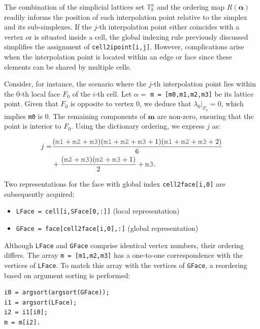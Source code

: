 \documentclass[12pt, a4paper]{article}
\newcommand{\mc}{\mcode}
\begin{document}
The combination of the simplicial lattices set \(\mathbb T^n_k\) and the ordering map \(R(\boldsymbol \alpha)\) readily informs the position of each interpolation point relative to the simplex and its sub-simplexes. If the $j$-th interpolation point either coincides with a vertex or is situated inside a cell, the global indexing rule previously discussed simplifies the assignment of \lstinline{cell2ipoint[i,j]}. However, complications arise when the interpolation point is located within an edge or face since these elements can be shared by multiple cells.

Consider, for instance, the scenario where the $j$-th interpolation point lies within the $0$-th local face \(F_0\) of the $i$-th cell. Let \(\alpha = \) \lstinline{m = [m0,m1,m2,m3]} be its lattice point. Given that \(F_0\) is opposite to vertex $0$, we deduce that \(\lambda_0|_{F_0} = 0\), which implies \lstinline{m0} is 0. The remaining components of \(\boldsymbol m\) are non-zero, ensuring that the point is interior to \(F_0\). Using the dictionary ordering, we express \(j\) as:

\begin{align*}
j =& \frac{(\mc{m1} + \mc{m2} + \mc{m3})(\mc{m1} + \mc{m2} + \mc{m3} + 1)(\mc{m1} + \mc{m2} + \mc{m3} + 2)}{6} \\
&+ \frac{(\mc{m2} + \mc{m3})(\mc{m2} + \mc{m3} + 1)}{2} + \mc{m3}.
\end{align*}

Two representations for the face with global index \lstinline{cell2face[i,0]} are subsequently acquired:

\begin{itemize}
  \item \lstinline{LFace = cell[i,SFace[0,:]]} (local representation)
  \item \lstinline{GFace = face[cell2face[i,0],:]} (global representation)
\end{itemize}

Although \lstinline{LFace} and \lstinline{GFace} comprise identical vertex numbers, their ordering differs. The array \lstinline{m = [m1,m2,m3]} has a one-to-one correspondence with the vertices of \lstinline{LFace}. To match this array with the vertices of \lstinline{GFace}, a reordering based on argument sorting is performed:

\begin{lstlisting}
i0 = argsort(argsort(GFace));
i1 = argsort(LFace);
i2 = i1[i0];
m = m[i2].
\end{lstlisting}
\end{document}

